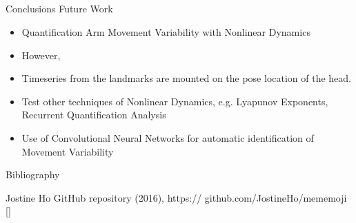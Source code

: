 \documentclass[compress]{beamer}
\begin{document}
\subsection{}
{
\begin{frame}{Conclusions Future Work}

\begin{itemize}
	\item Quantification Arm Movement Variability with Nonlinear Dynamics
        \item However,
        \item Timeseries from the landmarks are mounted on the pose location of the head. 
\end{itemize}

\begin{itemize}
	\item Test other techniques of Nonlinear Dynamics, e.g. Lyapunov Exponents, Recurrent Quantification Analysis
	\item Use of Convolutional Neural Networks for automatic identification of Movement Variability
\end{itemize}



\end{frame}
}






\begin{frame}{Bibliography}
    \begin{thebibliography}{10}

\beamertemplatearticlebibitems
      Jostine Ho       
      \newblock {}
      \newblock GitHub repository (2016), https:// github.com/JostineHo/mememoji [\href{https:// github.com/JostineHo/mememoji}{\faGithub}]


    \end{thebibliography}
\end{frame}




\closingtitle


\end{document}
